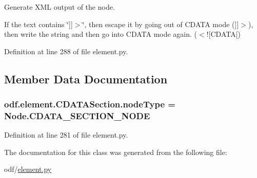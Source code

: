 Generate X\+M\+L output of the node. 

If the text contains \char`\"{}\mbox{]}\mbox{]}$>$\char`\"{}, then escape it by going out of C\+D\+A\+T\+A mode (\mbox{]}\mbox{]}$>$), then write the string and then go into C\+D\+A\+T\+A mode again. ($<$!\mbox{[}C\+D\+A\+T\+A\mbox{[}) 

Definition at line 288 of file element.\+py.



\subsection{Member Data Documentation}
\hypertarget{classodf_1_1element_1_1CDATASection_a77185faced1c6e282b1456892a7ac36d}{
\subsubsection[{node\+Type}]{\setlength{\rightskip}{0pt plus 5cm}odf.\+element.\+C\+D\+A\+T\+A\+Section.\+node\+Type = Node.\+C\+D\+A\+T\+A\+\_\+\+S\+E\+C\+T\+I\+O\+N\+\_\+\+N\+O\+D\+E\hspace{0.3cm}{\ttfamily [static]}}}\label{classodf_1_1element_1_1CDATASection_a77185faced1c6e282b1456892a7ac36d}


Definition at line 281 of file element.\+py.



The documentation for this class was generated from the following file\+:\begin{DoxyCompactItemize}
\item 
odf/\hyperlink{element_8py}{element.\+py}\end{DoxyCompactItemize}
